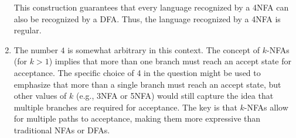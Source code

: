 \documentclass[letterpaper,12pt]{article}
\begin{document}
\begin{enumerate}
    This construction guarantees that every language recognized by a 4NFA can also be recognized by a DFA. Thus, the language recognized by a 4NFA is regular.

    \item The number $4$ is somewhat arbitrary in this context. The concept of \(k\)-NFAs (for \(k > 1\)) implies that more than one branch must reach an accept state for acceptance. The specific choice of 4 in the question might be used to emphasize that more than a single branch must reach an accept state, but other values of \(k\) (e.g., 3NFA or 5NFA) would still capture the idea that multiple branches are required for acceptance. The key is that \(k\)-NFAs allow for multiple paths to acceptance, making them more expressive than traditional NFAs or DFAs.



\end{enumerate}
\end{document}
